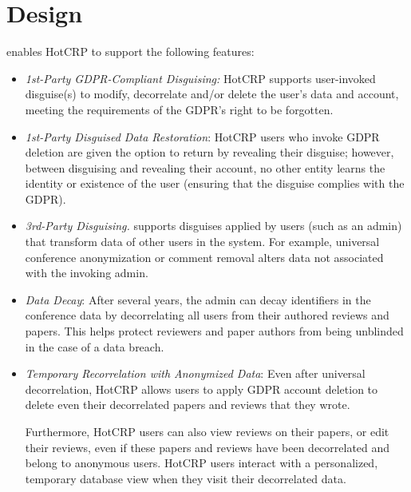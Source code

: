 \section{Design}


\sys enables HotCRP to support the following features:
\begin{itemize}
    \item\emph{1st-Party GDPR-Compliant Disguising:}
HotCRP supports user-invoked disguise(s) to modify, decorrelate and/or delete the user's data and
account, meeting the requirements of the GDPR's right to be forgotten.

    \item \emph{1st-Party Disguised Data Restoration}: HotCRP users who invoke GDPR deletion are given the
        option to return by revealing their disguise; however, between disguising and revealing
        their account, no other entity learns the identity or existence of the user (ensuring that
        the disguise complies with the GDPR).

    \item\emph{3rd-Party Disguising.}
\sys supports disguises applied by users (such as an admin) that transform data of other users in the system. For example, universal conference anonymization or
    comment removal alters data not associated with the invoking admin.

\item \emph{Data Decay}: After several years, the admin can decay identifiers in the conference data
    by decorrelating all users from their authored reviews and papers.  This helps protect reviewers
        and paper authors from being unblinded in the case of a data breach.

\item \emph{Temporary Recorrelation with Anonymized Data}:
Even after universal decorrelation, HotCRP allows users to apply GDPR account
deletion to delete even their decorrelated papers and reviews that they wrote.
%

%
Furthermore, HotCRP users can also view reviews on their papers, or edit their reviews, even if
        these papers and reviews have been decorrelated and belong to anonymous users.  HotCRP users
        interact with a personalized, temporary database view when they visit their decorrelated
        data.


\end{itemize}
